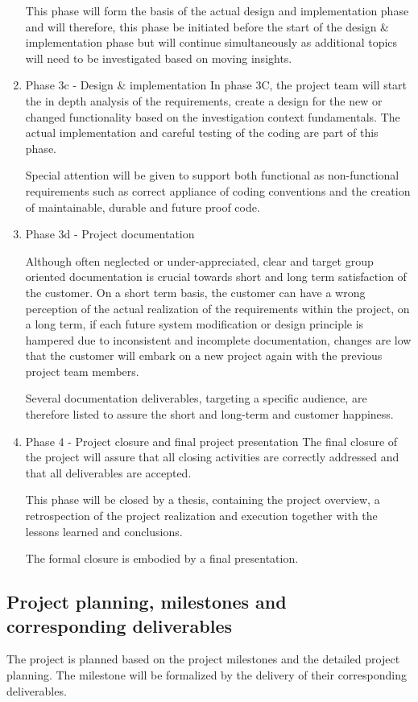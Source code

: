 \begin{enumerate}
		This phase will form the basis of the actual design and implementation phase and will therefore, this phase be initiated before the start of the design \& implementation phase but will continue simultaneously as additional  topics will need to be investigated based on moving insights. 

 	\item Phase 3c - Design \& implementation
	In phase 3C, the project team will start the in depth analysis of the requirements, create a design for the new or changed functionality based on the investigation context fundamentals.
	The actual implementation and careful testing of the coding are part of this phase. 

	Special attention will be given to support both functional as non-functional requirements such as correct appliance of coding conventions and the creation of maintainable, durable and future proof code.

 	\item Phase 3d - Project documentation

	Although often neglected or under-appreciated, clear and target group oriented documentation is crucial towards short and long term satisfaction of the customer.
	On a short term basis, the customer can have a wrong perception of the actual realization of the requirements within the project, on a long term, if each future system modification or design principle is hampered due to inconsistent and incomplete documentation, changes are low that the customer will embark on a new project again with the previous project team members.

	Several documentation deliverables, targeting a specific audience, are therefore listed to assure the short and long-term and customer happiness.

	\item Phase 4 - Project closure and final project presentation
	The final closure of the project will assure that all closing activities are correctly addressed and that all deliverables are accepted.

	This phase will be closed by a thesis, containing the project overview, a retrospection of the project realization and execution together with the lessons learned and conclusions.

	The formal closure is embodied by a final presentation.
\end {enumerate}

\subsection{Project planning, milestones and corresponding deliverables }
The project is planned based on the project milestones and the detailed project planning. The milestone will be formalized by the delivery of their corresponding deliverables.


